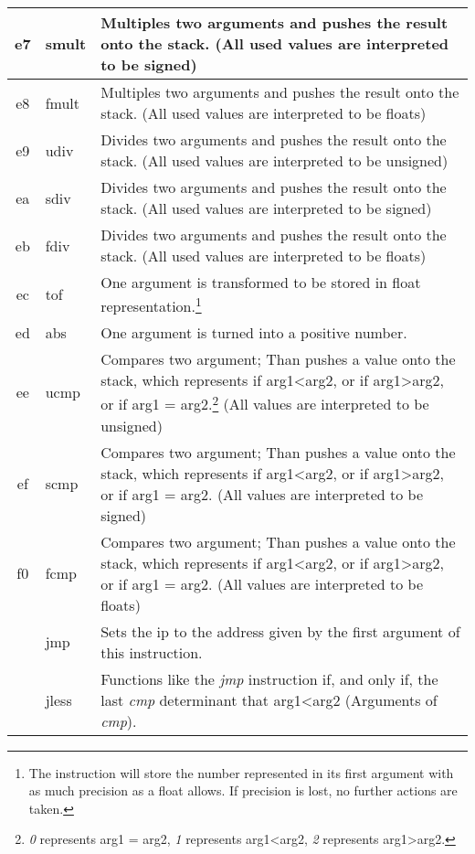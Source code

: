 \documentclass[10pt,a4paper]{article}
\makeatletter
\newcommand\footnoteref[1]{\protected@xdef\@thefnmark{\ref{#1}}\@footnotemark}
\makeatother
\begin{document}
\begin{longtable}[c]{c|l|p{9cm}}
		\hline
		\hex e7 & smult & Multiples two arguments and pushes the result onto the stack. (All used values are interpreted to be signed) \\	
		\hline
		\hex e8 & fmult & Multiples two arguments and pushes the result onto the stack. (All used values are interpreted to be floats) \\
		\hline
		\hex e9 & udiv & Divides two arguments and pushes the result onto the stack. (All used values are interpreted to be unsigned) \\	
		\hline
		\hex ea & sdiv & Divides two arguments and pushes the result onto the stack. (All used values are interpreted to be signed) \\	
		\hline
		\hex eb & fdiv & Divides two arguments and pushes the result onto the stack. (All used values are interpreted to be floats) \\
		\hline
		\hex ec & tof & One argument is transformed to be stored in float representation.\footnote{The instruction will store the number represented in its first argument with as much precision as a float allows. If precision is lost, no further actions are taken.} \\
		\hline
		\hex ed & abs & One argument is turned into a positive number. \\
		\hline
		\hex ee & ucmp & Compares two argument; Than pushes a value onto the stack, which represents if arg1\textless arg2, or if arg1\textgreater arg2, or if arg1 = arg2.\footnote{\label{cmp_footnote} \textit{0} represents arg1 = arg2, \textit{1} represents arg1\textless arg2, \textit{2} represents arg1\textgreater arg2.} (All values are interpreted to be unsigned) \\
		\hline
		\hex ef & scmp & Compares two argument; Than pushes a value onto the stack, which represents if arg1\textless arg2, or if arg1\textgreater arg2, or if arg1 = arg2.\footnoteref{cmp_footnote} (All values are interpreted to be signed) \\
		\hline
		\hex f0 & fcmp & Compares two argument; Than pushes a value onto the stack, which represents if arg1\textless arg2, or if arg1\textgreater arg2, or if arg1 = arg2.\footnoteref{cmp_footnote} (All values are interpreted to be floats) \\
		\hline		
		\hline
		\hex 01 & jmp & Sets the ip to the address given by the first argument of this instruction. \\
		\hline
		\hex 02 & jless & Functions like the \textit{jmp} instruction if, and only if, the last \textit{cmp} determinant that arg1\textless arg2 (Arguments of \textit{cmp}). \\

\end{longtable}
\end{document}
